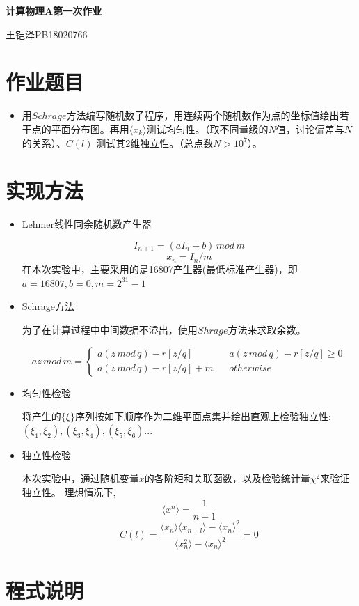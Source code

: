\documentclass[UTF8]{ctexart}
\begin{document}
	\centering\textbf{\LARGE{计算物理A第一次作业}}
	
	
	王铠泽\qquad PB18020766
	
		
	\section{作业题目}
	
	\begin{itemize}
		\item 用$Schrage$方法编写随机数子程序，用连续两个随机数作为点的坐标值绘出若干点的平面分布图。再用$\langle x_k\rangle$测试均匀性。（取不同量级的$N$值，讨论偏差与$N$的关系）、$C(l)$ 测试其2维独立性。（总点数$N>10^7$）。
	\end{itemize}
	
	\section{实现方法}
	
	\begin{itemize}
		\item Lehmer线性同余随机数产生器
		
		$$I_{n+1}=(aI_n+b)\,mod\,m$$
		$$x_n=I_n/m$$
		在本次实验中，主要采用的是16807产生器(最低标准产生器)，即 $a=16807,b=0,m=2^{31}-1$
		\item Schrage方法
		
		为了在计算过程中中间数据不溢出，使用$Shrage$方法来求取余数。
		
		$$az\,mod\, m=\left\{
		\begin{array}{lcl}
		a(z\,mod\,q)-r[z/q]       &      &a(z\,mod\,q)-r[z/q] \geq0 \\
		a(z\,mod\,q)-r[z/q]+m&      & otherwise
		\end{array} \right. $$
		
		\item 均匀性检验
		
			\subitem 将产生的$\{\xi\}$序列按如下顺序作为二维平面点集并绘出直观上检验独立性:
		$(\xi_1,\xi_2),(\xi_3,\xi_4),(\xi_5,\xi_6)...$
		
		\item 独立性检验

		\subitem 本次实验中，通过随机变量$x$的各阶矩和关联函数，以及检验统计量$\chi^2$来验证独立性。
		理想情况下,
		$$\langle x^{n} \rangle=\frac{1}{n+1}$$
		$$C(l)=\frac{\langle x_n \rangle \langle x_{n+l} \rangle-\langle x_n \rangle^2}{ \langle x_n^2 \rangle-\langle x_n \rangle^2}=0$$
	\end{itemize}
	\section{程式说明}
	
\end{document}

